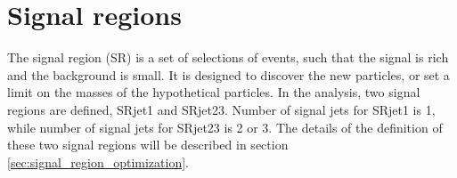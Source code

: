 \chapter{Signal regions}
\label{ch:SR}

The signal region (SR) is a set of selections of events, such that the signal is rich and the background is small.
It is designed to discover the new particles, or set a limit on the masses of the hypothetical particles.
In the analysis, two signal regions are defined, SRjet1 and SRjet23.
Number of signal jets for SRjet1 is 1, while number of signal jets for SRjet23 is 2 or 3.
The details of the definition of these two signal regions will be described in section \ref{sec:signal_region_optimization}.

